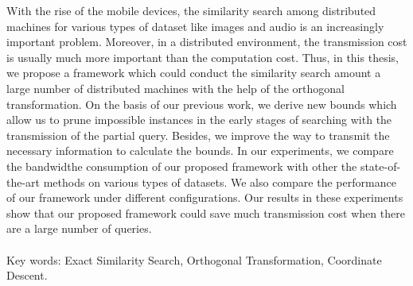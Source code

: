 \begin{abstractEN}

With the rise of the mobile devices, the similarity search among distributed machines for various types of dataset like images and audio is an increasingly important problem.  Moreover, in a distributed environment, the transmission cost is usually much more important than the computation cost.  Thus, in this thesis, we propose a framework which could conduct the similarity search amount a large number of distributed machines with the help of the orthogonal transformation.  On the basis of our previous work, we derive new bounds which allow us to prune impossible instances in the early stages of searching with the transmission of the partial query.  Besides, we improve the way to transmit the necessary information to calculate the bounds.  In our experiments, we compare the bandwidthe consumption of our proposed framework with other the state-of-the-art methods on various types of datasets.  We also compare the performance of our framework under different configurations.  Our results in these experiments show that our proposed framework could save much transmission cost when there are a large number of queries.
\\ \\
Key words: Exact Similarity Search, Orthogonal Transformation, Coordinate Descent.

\end{abstractEN}
